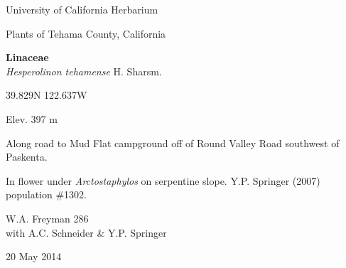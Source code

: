 \documentclass[letterpaper,10pt]{article}
\begin{document}
\begin{minipage}[t]{0.40\textwidth}

\begin{center}
University of California Herbarium \\
\begin{large}
Plants of Tehama County, California \\
\end{large}
\vspace{\baselineskip}
\textbf{Linaceae} \\
\textit{Hesperolinon tehamense} H. Sharsm.\\
\end{center}

\begin{footnotesize}

\begin{multicols}{2}
39.829\textdegree N 122.637\textdegree W
\columnbreak
\begin{flushright}
Elev. 397 m
\end{flushright}
\end{multicols}

Along road to Mud Flat campground off of Round Valley Road southwest of Paskenta.
\vspace{\baselineskip}

In flower under \textit{Arctostaphylos} on serpentine slope. Y.P. Springer (2007) population \#1302.

\begin{multicols}{2}
W.A. Freyman 286 \\
with A.C. Schneider \& Y.P. Springer
\columnbreak
\begin{flushright}
20 May 2014
\end{flushright}
\end{multicols}

\end{footnotesize}

\end{minipage}
%
\hspace{2cm}
%
\end{document}

